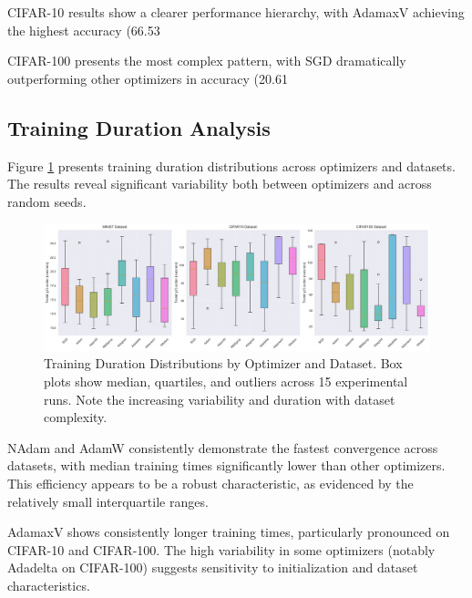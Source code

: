 \documentclass[conference]{IEEEtran}
\begin{document}
CIFAR-10 results show a clearer performance hierarchy, with AdamaxV achieving the highest accuracy (66.53%

CIFAR-100 presents the most complex pattern, with SGD dramatically outperforming other optimizers in accuracy (20.61%

\subsection{Training Duration Analysis}

Figure \ref{fig:training_duration} presents training duration distributions across optimizers and datasets. The results reveal significant variability both between optimizers and across random seeds.

\begin{figure}[htbp]
\centering
\includegraphics[width=\textwidth]{../results/plots/training_duration_boxplots.png}
\caption{Training Duration Distributions by Optimizer and Dataset. Box plots show median, quartiles, and outliers across 15 experimental runs. Note the increasing variability and duration with dataset complexity.}
\label{fig:training_duration}
\end{figure}

NAdam and AdamW consistently demonstrate the fastest convergence across datasets, with median training times significantly lower than other optimizers. This efficiency appears to be a robust characteristic, as evidenced by the relatively small interquartile ranges.

AdamaxV shows consistently longer training times, particularly pronounced on CIFAR-10 and CIFAR-100. The high variability in some optimizers (notably Adadelta on CIFAR-100) suggests sensitivity to initialization and dataset characteristics.
\end{document}
